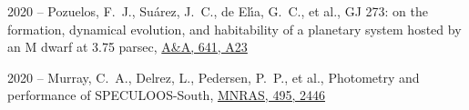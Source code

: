 \documentclass[10pt,letterpaper]{article}
\newcommand{\publi}[4]{\item #1 -- #3, #2, #4}
\newcommand{\mnras}{MNRAS}
\newcommand{\aap}{A\&A}
\begin{document}
\begin{etaremune}
    \publi{2020}{GJ 273: on the formation, dynamical evolution, and habitability of a planetary system hosted by an M dwarf at 3.75 parsec}
    {Pozuelos, F.~J., Su{\'a}rez, J.~C., de El{\'\i}a, G.~C., et al.}
    {\href{https://ui.adsabs.harvard.edu/abs/2020A\&A...641A..23P}{\aap, 641, A23}}
    
    \publi{2020}{Photometry and performance of SPECULOOS-South}
    {Murray, C.~A., Delrez, L., Pedersen, P.~P., et al.}
    {\href{https://ui.adsabs.harvard.edu/abs/2020MNRAS.495.2446M}{\mnras, 495, 2446}}
\end{etaremune}
\end{document}
